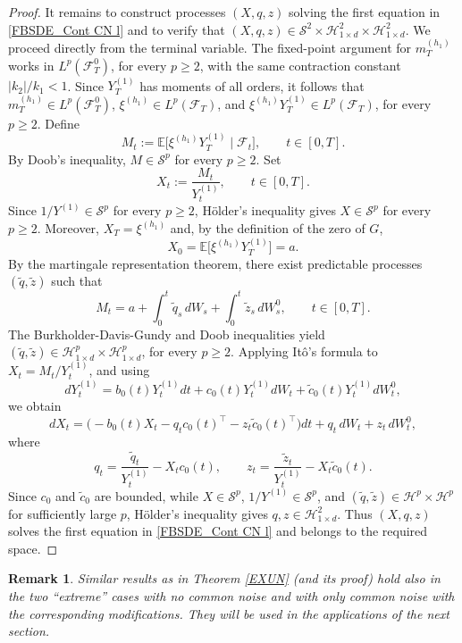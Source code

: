 \documentclass[11pt,a4paper]{article}
\newtheorem{rem}[theo]{Remark}
\begin{document}
\begin{proof}
It remains to construct processes \((X,q,z)\) solving the first equation in \eqref{FBSDE_Cont CN l} and to verify that \((X,q,z)\in \mathcal S^2\times\mathcal H^2_{1\times d}\times\mathcal H^2_{1\times d}\). We proceed directly from the terminal variable. The fixed-point argument for \(m_T^{(h_1)}\) works in \(L^p(\mathcal F_T^0)\), for every \(p\ge2\), with the same contraction constant \(|k_2|/k_1<1\). Since \(Y_T^{(1)}\) has moments of all orders, it follows that \(m_T^{(h_1)}\in L^p(\mathcal F_T^0)\), \(\xi^{(h_1)}\in L^p(\mathcal F_T)\), and \(\xi^{(h_1)}Y_T^{(1)}\in L^p(\mathcal F_T)\), for every \(p\ge2\). Define
\[
M_t:=\mathbb E\big[\xi^{(h_1)}Y_T^{(1)}\mid \mathcal F_t\big], \qquad t\in[0,T].
\]
By Doob's inequality, \(M\in\mathcal S^p\) for every \(p\ge2\). Set
\[
X_t:=\frac{M_t}{Y_t^{(1)}}, \qquad t\in[0,T].
\]
Since \(1/Y^{(1)}\in\mathcal S^p\) for every \(p\ge2\), H\"older's inequality gives \(X\in\mathcal S^p\) for every \(p\ge2\). Moreover, \(X_T=\xi^{(h_1)}\) and, by the definition of the zero of \(G\),
\[
X_0=\mathbb E\big[\xi^{(h_1)}Y_T^{(1)}\big]=a.
\]
By the martingale representation theorem, there exist predictable processes \((\widetilde q,\widetilde z)\) such that
\[
M_t=a+\int_0^t\widetilde q_s\,dW_s+\int_0^t\widetilde z_s\,dW_s^0, \qquad t\in[0,T].
\]
The Burkholder-Davis-Gundy and Doob inequalities yield \((\widetilde q,\widetilde z)\in\mathcal H^p_{1\times d}\times\mathcal H^p_{1\times d}\), for every \(p\ge2\). Applying It\^o's formula to \(X_t=M_t/Y_t^{(1)}\), and using
\[
dY_t^{(1)}=b_0(t)Y_t^{(1)}dt+c_0(t)Y_t^{(1)}dW_t+\widetilde c_0(t)Y_t^{(1)}dW_t^0,
\]
we obtain
\[
dX_t=\big(-b_0(t)X_t-q_tc_0(t)^\top-z_t\widetilde c_0(t)^\top\big)dt+q_t\,dW_t+z_t\,dW_t^0,
\]
where
\[
q_t=\frac{\widetilde q_t}{Y_t^{(1)}}-X_tc_0(t),\qquad
z_t=\frac{\widetilde z_t}{Y_t^{(1)}}-X_t\widetilde c_0(t).
\]
Since \(c_0\) and \(\widetilde c_0\) are bounded, while \(X\in\mathcal S^p\), \(1/Y^{(1)}\in\mathcal S^p\), and \((\widetilde q,\widetilde z)\in\mathcal H^p\times\mathcal H^p\) for sufficiently large \(p\), H\"older's inequality gives \(q,z\in\mathcal H^2_{1\times d}\). Thus \((X,q,z)\) solves the first equation in \eqref{FBSDE_Cont CN l} and belongs to the required space.
\end{proof}


\begin{rem}
\label{remExun}
Similar results as in Theorem \ref{EXUN} (and its proof) hold also in the two ``extreme'' cases with no common noise and with only common noise with the corresponding modifications. They will be used in the applications of the next section.
\end{rem}
\end{document}
